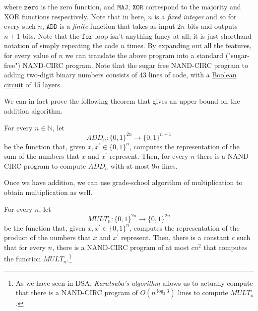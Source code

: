   where $\texttt{zero}$ is the zero function, and $\texttt{MAJ, XOR}$ correspond to the majority and XOR functions respectively. Note that in here, $n$ is a \textit{fixed integer} and so for every such $n$, $\texttt{ADD}$ is a \textit{finite} function that takes as input $2n$ bits and outputs $n+1$ bits. Note that the $\texttt{for}$ loop isn't anything fancy at all; it is just shorthand notation of simply repeating the code $n$ times. By expanding out all the features, for every value of $n$ we can translate the above program into a standard ("sugar-free") NAND-CIRC program. Note that the sugar free NAND-CIRC program to adding two-digit binary numbers consists of 43 lines of code, with a \hyperref[def:boolean-circuit]{Boolean circuit} of 15 layers. 

  We can in fact prove the following theorem that gives an upper bound on the addition algorithm. 

  \begin{theorem}
    \label{thm:addition-using-nand-circ-programs}
    For every $n \in \mathbb{N}$, let 
    \begin{equation}
      ADD_n : \{0,1\}^{2n} \to \{0,1\}^{n+1}
    \end{equation}
    be the function that, given $x, x^\prime \in \{0,1\}^n$, computes the representation of the sum of the numbers that $x$ and $x^\prime$ represent. Then, for every $n$ there is a NAND-CIRC program to compute $ADD_n$ with at most $9n$ lines. 
  \end{theorem}

  Once we have addition, we can use grade-school algorithm of multiplication to obtain multiplication as well. 

  \begin{theorem}
    \label{thm:muliplication-using-nand-circ-programs}
    For every $n$, let 
    \begin{equation}
      MULT_n : \{0,1\}^{2n} \to \{0,1\}^{2n}
    \end{equation}
    be the function that, given $x, x^\prime \in \{0,1\}^n$, computes the representation of the product of the numbers that $x$ and $x^\prime$ represent. Then, there is a constant $c$ such that for every $n$, there is a NAND-CIRC program of at most $cn^2$ that computes the function $MULT_n$.\footnote{As we have seen in DSA, \textit{Karatsuba's algorithm} allows us to actually compute that there is a NAND-CIRC program of $O(n^{\log_2 3})$ lines to compute $MULT_n$. }
  \end{theorem}

